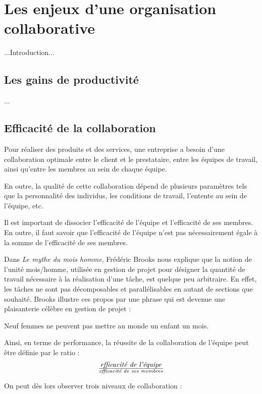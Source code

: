 \chapter{Les enjeux d'une organisation collaborative}

...Introduction...

\section{Les gains de productivité}

...

\section{Efficacité de la collaboration}

Pour réaliser des produits et des services, une entreprise a besoin d'une collaboration optimale entre le client et le prestataire, entre les équipes de travail, ainsi qu'entre les membres au sein de chaque équipe.

En outre, la qualité de cette collaboration dépend de plusieurs paramètres tels que la personnalité des individus, les conditions de travail, l'entente au sein de l'équipe, etc.

Il est important de dissocier l'efficacité de l'équipe et l'efficacité de ses membres. En outre, il faut savoir que l'efficacité de l'équipe n'est pas nécessairement égale à la somme de l'efficacité de ses membres.

Dans \textit{Le mythe du mois homme}, Frédéric Brooks nous explique que la notion de l'unité mois/homme, utilisée en gestion de projet pour désigner la quantité de travail nécessaire à la réalisation d'une tâche, est quelque peu arbitraire. En effet, les tâches ne sont pas décomposables et parallélisables en autant de sections que souhaité. Brooks illustre ces propos par une phrase qui est devenue une plaisanterie célèbre en gestion de projet : \begin{Quote}Neuf femmes ne peuvent pas mettre au monde un enfant un mois.\end{Quote}

Ainsi, en terme de performance, la réussite de la collaboration de l'équipe peut être définie par le ratio : \[\text{\textit{efficacité de l'équipe}} \over \text{\textit{efficacité de ses membres}}\]

On peut dès lors observer trois niveaux de collaboration :

